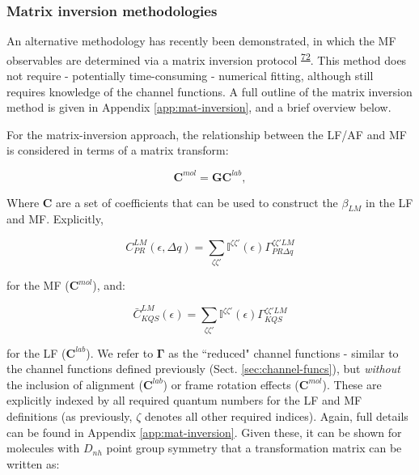\documentclass[10pt]{article}
\begin{document}
\subsubsection{Matrix inversion methodologies\label{sec:matrix-inv-intro}}

An alternative methodology has recently been demonstrated, in which the MF observables are determined via a matrix inversion protocol \textsuperscript{\hyperref[csl:72]{72}}. This method does not require - potentially time-consuming - numerical fitting, although still requires knowledge of the channel functions. A full outline of the matrix inversion method is given in Appendix \ref{app:mat-inversion}, and a brief overview below.

For the matrix-inversion approach, the relationship between the LF/AF and MF is considered in terms of a matrix transform:

\begin{equation}
\mathbf{C}^{mol}=\mathbf{G}\mathbf{C}^{lab},\label{eq:basic}
\end{equation}

Where $\mathbf{C}$ are a set of coefficients that can be used to construct the $\beta_{LM}$ in the LF and MF. Explicitly, 


\begin{equation}
C_{PR}^{LM}(\epsilon,\Delta q)=\sum_{\zeta\zeta'}\mathbb{I}^{\zeta\zeta'}(\epsilon)\Gamma_{PR\Delta q}^{\zeta\zeta'LM}
\end{equation}

for the MF ($\mathbf{C}^{mol}$), and:

\begin{equation}
\bar{C}_{KQS}^{LM}(\epsilon)=\sum_{\zeta\zeta'}\mathbb{I}^{\zeta\zeta'}(\epsilon)\Gamma_{KQS}^{\zeta\zeta'LM}
\label{eq:C-AF}
\end{equation}

for the LF ($\mathbf{C}^{lab}$). We refer to $\mathbf{\Gamma}$ as the ``reduced" channel functions - similar to the channel functions defined previously (Sect. \ref{sec:channel-funcs}), but \textit{without} the inclusion of alignment ($\mathbf{C}^{lab}$) or frame rotation effects ($\mathbf{C}^{mol}$). These are explicitly indexed by all required quantum numbers for the LF and MF definitions (as previously, $\zeta$ denotes all other required indices). Again, full details can be found in Appendix \ref{app:mat-inversion}. Given these, it can be shown for molecules with $D_{nh}$ point group symmetry that a transformation matrix can be written as:
\end{document}
